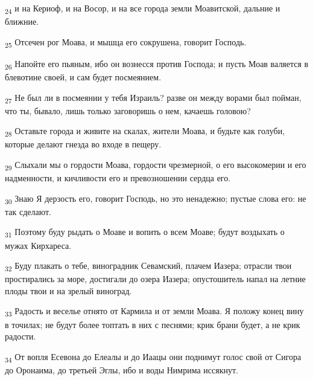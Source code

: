 \begin{tcolorbox}
\textsubscript{24} и на Кериоф, и на Восор, и на все города земли Моавитской, дальние и ближние.
\end{tcolorbox}
\begin{tcolorbox}
\textsubscript{25} Отсечен рог Моава, и мышца его сокрушена, говорит Господь.
\end{tcolorbox}
\begin{tcolorbox}
\textsubscript{26} Напойте его пьяным, ибо он вознесся против Господа; и пусть Моав валяется в блевотине своей, и сам будет посмеянием.
\end{tcolorbox}
\begin{tcolorbox}
\textsubscript{27} Не был ли в посмеянии у тебя Израиль? разве он между ворами был пойман, что ты, бывало, лишь только заговоришь о нем, качаешь головою?
\end{tcolorbox}
\begin{tcolorbox}
\textsubscript{28} Оставьте города и живите на скалах, жители Моава, и будьте как голуби, которые делают гнезда во входе в пещеру.
\end{tcolorbox}
\begin{tcolorbox}
\textsubscript{29} Слыхали мы о гордости Моава, гордости чрезмерной, о его высокомерии и его надменности, и кичливости его и превозношении сердца его.
\end{tcolorbox}
\begin{tcolorbox}
\textsubscript{30} Знаю Я дерзость его, говорит Господь, но это ненадежно; пустые слова его: не так сделают.
\end{tcolorbox}
\begin{tcolorbox}
\textsubscript{31} Поэтому буду рыдать о Моаве и вопить о всем Моаве; будут воздыхать о мужах Кирхареса.
\end{tcolorbox}
\begin{tcolorbox}
\textsubscript{32} Буду плакать о тебе, виноградник Севамский, плачем Иазера; отрасли твои простирались за море, достигали до озера Иазера; опустошитель напал на летние плоды твои и на зрелый виноград.
\end{tcolorbox}
\begin{tcolorbox}
\textsubscript{33} Радость и веселье отнято от Кармила и от земли Моава. Я положу конец вину в точилах; не будут более топтать в них с песнями; крик брани будет, а не крик радости.
\end{tcolorbox}
\begin{tcolorbox}
\textsubscript{34} От вопля Есевона до Елеалы и до Иаацы они поднимут голос свой от Сигора до Оронаима, до третьей Эглы, ибо и воды Нимрима иссякнут.
\end{tcolorbox}

